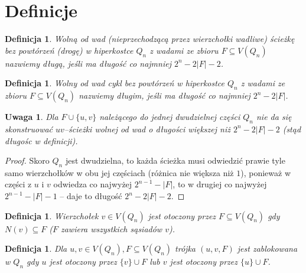 \documentclass{pracamgr}
\newtheorem{defi}[theorem]{Definicja} %
\newtheorem{remark}[theorem]{Uwaga}
\begin{document}
  \section{Definicje}
   \begin{defi}\label{dluga sciezka}
    Wolną od wad (nieprzechodzącą przez wierzchołki wadliwe)
    ścieżkę bez powtórzeń (drogę) w hiperkostce $Q_n$ z wadami ze zbioru $F\subseteq V(Q_n)$ nazwiemy długą, jeśli ma długość co najmniej $2^n-2|F|-2$.
   \end{defi}
   \begin{defi}\label{dlugi cykl}
    Wolny od wad cykl bez powtórzeń w hiperkostce $Q_n$ z wadami ze zbioru $F\subseteq V(Q_n)$ nazwiemy długim, jeśli ma długość co najmniej $2^n-2|F|$.
   \end{defi}
   \begin{remark}\label{dluga sciezka- nie da sie dluzszej}
    Dla $F\cup\{u,v\}$ należącego do jednej dwudzielnej części $Q_n$ nie da się skonstruować $uv$--ścieżki wolnej od wad o długości większej niż $2^n-2|F|-2$
    (stąd długośc w definicji).
   \end{remark}
   \begin{proof}
    Skoro $Q_n$ jest dwudzielna, to każda ścieżka musi odwiedzić prawie tyle samo wierzchołków w obu jej częściach (różnica nie większa niż $1$),
    ponieważ w części z $u$ i $v$ odwiedza co najwyżej $2^{n-1}-|F|$, to w drugiej co najwyżej $2^{n-1}-|F|-1$ -- daje to długość $2^n-2|F|-2$.
   \end{proof}
   \begin{defi}\label{wierzcholek otoczony}
    Wierzchołek $v\in V(Q_n)$ jest \emph{otoczony} przez $F\subseteq V(Q_n)$ gdy $N(v)\subseteq F$ ($F$ zawiera wszystkich sąsiadów $v$).
   \end{defi}
   \begin{defi}\label{para zablokowana}
    Dla $u,v\in V(Q_n), F\subseteq V(Q_n)$
    trójka $(u,v,F)$ jest \emph{zablokowana w $Q_n$} gdy $u$ jest otoczony przez $\{v\}\cup F$ lub $v$ jest otoczony przez $\{u\}\cup F$.
   \end{defi}
\end{document}
